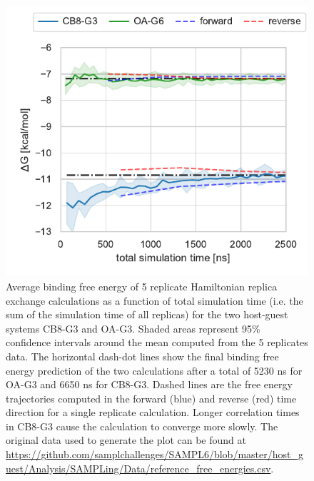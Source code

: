 \documentclass[9pt,bestpractices]{livecoms}
\begin{document}
\begin{figure}
    \includegraphics[width=0.90\linewidth]{figures/fig9_convergence/Figure.pdf}
    \caption{Average binding free energy of 5 replicate Hamiltonian replica exchange calculations as a function of total simulation time (i.e. the sum of the simulation time of all replicas) for the two host-guest systems CB8-G3 and OA-G3. Shaded areas represent 95\% confidence intervals around the mean computed from the 5 replicates data. The horizontal dash-dot lines show the final binding free energy prediction of the two calculations after a total of 5230 ns for OA-G3 and 6650 ns for CB8-G3. Dashed lines are the free energy trajectories computed in the forward (blue) and reverse (red) time direction for a single replicate calculation. Longer correlation times in CB8-G3 cause the calculation to converge more slowly. The original data used to generate the plot can be found at \url{https://github.com/samplchallenges/SAMPL6/blob/master/host_guest/Analysis/SAMPLing/Data/reference_free_energies.csv}.
}
    \label{fig:freeenergytrajectories}
\end{figure}
\end{document}
